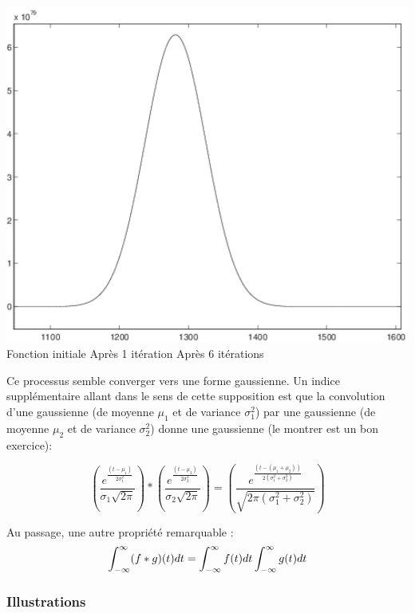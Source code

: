 \begin{example}
\begin{center}
\includegraphics[scale=0.25]{convgauss3.pdf}
Fonction initiale \hspace*{1cm} Après 1 itération \hspace*{1cm} Après 6 itérations \\
\end{center}

Ce processus semble converger vers une forme gaussienne.  Un indice
supplémentaire allant dans le sens de cette supposition est que la
convolution d'une gaussienne (de moyenne $\mu_1$ et de variance
$\sigma_1^2$) par une gaussienne (de moyenne $\mu_2$ et de variance
$\sigma_2^2$) donne une gaussienne (le montrer est un bon exercice):

\begin{equation}
(\frac{e^\frac{(t-\mu_1)}{2\sigma_1^2}}{\sigma_1\sqrt{2\pi}})*
(\frac{e^\frac{(t-\mu_2)}{2\sigma_2^2}}{\sigma_2\sqrt{2\pi}})=(\frac{e^\frac{(t-(\mu_1+\mu_2))}{2(\sigma_1^2+\sigma_2^2)}}{\sqrt{2\pi(\sigma_1^2+\sigma_2^2)}})
\end{equation}

\end{example}

Au passage, une autre propriété remarquable :
\begin{equation}
  \int_{-\infty}^{\infty} (f*g)(t) dt=\int_{-\infty}^{\infty} f(t)dt \int_{-\infty}^{\infty} g(t)dt
\end{equation}

\subsubsection*{Illustrations}

